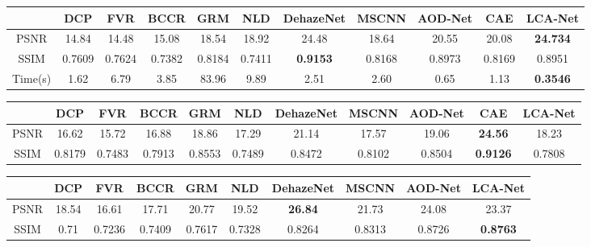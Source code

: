 \documentclass[conference]{IEEEtran}
\begin{document}
\begin{table*}[hbt!]
\centering
\captionsetup{justification=centering}
\renewcommand{\arraystretch}{2}
\begin{tabular}{|c|c|c|c|c|c|c|c|c|c|c|}
\hline
     & DCP \cite{5567108}& FVR \cite{5459251} & BCCR \cite{Meng_2013_ICCV}   & GRM \cite{10.1007/978-3-319-46475-6_36}    & NLD \cite{Berman_2016_CVPR} & DehazeNet \cite{7539399}       & MSCNN \cite{10.1007/978-3-319-46475-6_10}  & AOD-Net \cite{Li_2017_ICCV} & CAE \cite{8803478} & LCA-Net         \\ \hline
PSNR & 14.84  & 14.48      & 15.08  & 18.54  & 18.92      & 24.48           & 18.64  & 20.55   & 20.08      & \textbf{24.734} \\ \hline
SSIM & 0.7609 & 0.7624     & 0.7382 & 0.8184 & 0.7411     & \textbf{0.9153} & 0.8168 & 0.8973  & 0.8169     & 0.8951          \\ \hline
Time(s) & 1.62 & 6.79 & 3.85 & 83.96 & 9.89 & 2.51 & 2.60 & 0.65 & 1.13 & \textbf{0.3546} \\
\hline
\end{tabular}

\caption{Dehaze results on synthetic hazy images from HSTS}
\label{tab:1}
\vspace{7mm}

\centering
\renewcommand{\arraystretch}{2}
\captionsetup{justification=centering}
\begin{tabular}{|c|c|c|c|c|c|c|c|c|c|c|}
\hline
     & DCP \cite{5567108}& FVR \cite{5459251} & BCCR \cite{Meng_2013_ICCV}   & GRM \cite{10.1007/978-3-319-46475-6_36}    & NLD \cite{Berman_2016_CVPR} & DehazeNet \cite{7539399}       & MSCNN \cite{10.1007/978-3-319-46475-6_10}  & AOD-Net \cite{Li_2017_ICCV} & CAE \cite{8803478} & LCA-Net \\ \hline
PSNR & 16.62  & 15.72  & 16.88  & 18.86  & 17.29  & 21.14     & 17.57  & 19.06   & \textbf{24.56}  & 18.23   \\ \hline
SSIM & 0.8179 & 0.7483 & 0.7913 & 0.8553 & 0.7489 & 0.8472    & 0.8102 & 0.8504  & \textbf{0.9126} & 0.7808  \\ \hline
\end{tabular}
\caption{Dehaze results on Indoor hazy images from SOTS}
\label{tab:2}
\vspace{7mm}
\centering
\renewcommand{\arraystretch}{2}
\captionsetup{justification=centering}
\begin{tabular}{|c|c|c|c|c|c|c|c|c|c|}
\hline
 & DCP \cite{5567108}& FVR \cite{5459251} & BCCR \cite{Meng_2013_ICCV}   & GRM \cite{10.1007/978-3-319-46475-6_36}    & NLD \cite{Berman_2016_CVPR} & DehazeNet \cite{7539399}       & MSCNN \cite{10.1007/978-3-319-46475-6_10}  & AOD-Net \cite{Li_2017_ICCV} & LCA-Net \\ \hline
PSNR & 18.54 & 16.61 & 17.71 & 20.77 & 19.52 & \textbf{26.84} & 21.73 & 24.08 & 23.37 \\ \hline
SSIM & 0.71 & 0.7236 & 0.7409 & 0.7617 & 0.7328 & 0.8264 & 0.8313 & 0.8726 & \textbf{0.8763} \\ \hline
\end{tabular}
\caption{Dehaze results on Outdoor hazy images from SOTS}
\label{tab:3}

\end{table*}
\end{document}
